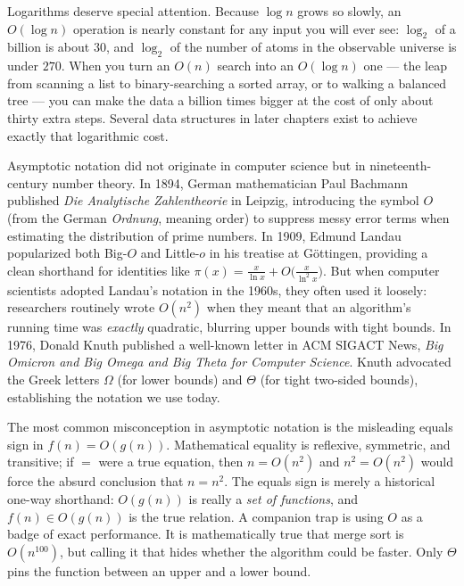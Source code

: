 \begin{aestheticbox}
Logarithms deserve special attention. Because $\log n$ grows so slowly, an
$O(\log n)$ operation is nearly constant for any input you will ever see: $\log_2$ of a
billion is about $30$, and $\log_2$ of the number of atoms in the observable universe is
under $270$. When you turn an $O(n)$ search into an $O(\log n)$ one --- the leap from
scanning a list to binary-searching a sorted array, or to walking a balanced tree --- you
can make the data a billion times bigger at the cost of only about thirty extra steps.
Several data structures in later chapters exist to achieve exactly that logarithmic cost.
\end{aestheticbox}

\begin{historybox}
Asymptotic notation did not originate in computer science but in nineteenth-century number theory. In
1894, German mathematician Paul Bachmann published \emph{Die Analytische Zahlentheorie} in Leipzig,
introducing the symbol $O$ (from the German \emph{Ordnung}, meaning order) to suppress messy error
terms when estimating the distribution of prime numbers. In 1909, Edmund Landau popularized both
Big-$O$ and Little-$o$ in his treatise at G\"ottingen, providing a clean shorthand for identities
like $\pi(x) = \frac{x}{\ln x} + O\bigl(\frac{x}{\ln^2 x}\bigr)$. But when computer scientists
adopted Landau's notation in the 1960s, they often used it loosely: researchers
routinely wrote $O(n^2)$ when they meant that an algorithm's running time was \emph{exactly}
quadratic, blurring upper bounds with tight bounds. In 1976, Donald Knuth published a well-known
letter in ACM SIGACT News, \emph{Big Omicron and Big Omega and Big Theta for Computer Science}.
Knuth advocated the Greek letters $\Omega$ (for lower bounds) and $\Theta$ (for tight two-sided
bounds), establishing the notation we use today.

The most common misconception in asymptotic notation is the misleading equals sign in
$f(n) = O(g(n))$. Mathematical equality is reflexive, symmetric, and transitive; if $=$ were a true
equation, then $n = O(n^2)$ and $n^2 = O(n^2)$ would force the absurd conclusion that $n = n^2$.
The equals sign is merely a historical one-way shorthand: $O(g(n))$ is really a \emph{set of
functions}, and $f(n) \in O(g(n))$ is the true relation. A companion trap is using $O$ as a badge
of exact performance. It is mathematically true that merge sort is $O(n^{100})$, but calling it
that hides whether the algorithm could be faster. Only $\Theta$ pins the function between an upper
and a lower bound.


\end{historybox}
